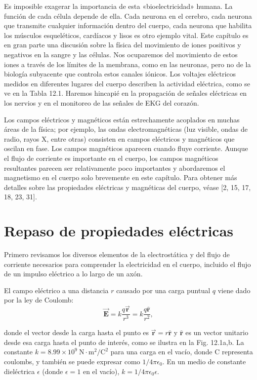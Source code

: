\documentclass[12pt]{book}
\begin{document}
Es imposible exagerar la importancia de esta «bioelectricidad» humana. La función de cada célula depende de ella. Cada neurona en el cerebro, cada neurona que transmite cualquier información dentro del cuerpo, cada neurona que habilita los músculos esqueléticos, cardíacos y lisos es otro ejemplo vital. Este capítulo es en gran parte una discusión sobre la física del movimiento de iones positivos y negativos en la sangre y las células. Nos ocuparemos del movimiento de estos iones a través de los límites de la membrana, como en las neuronas, pero no de la biología subyacente que controla estos canales iónicos. Los voltajes eléctricos medidos en diferentes lugares del cuerpo describen la actividad eléctrica, como se ve en la Tabla 12.1. Haremos hincapié en la propagación de señales eléctricas en los nervios y en el monitoreo de las señales de EKG del corazón.

Los campos eléctricos y magnéticos están estrechamente acoplados en muchas áreas de la física; por ejemplo, las ondas electromagnéticas (luz visible, ondas de radio, rayos X, entre otras) consisten en campos eléctricos y magnéticos que oscilan en fase. Los campos magnéticos aparecen cuando fluye corriente. Aunque el flujo de corriente es importante en el cuerpo, los campos magnéticos resultantes parecen ser relativamente poco importantes y abordaremos el magnetismo en el cuerpo solo brevemente en este capítulo. Para obtener más detalles sobre las propiedades eléctricas y magnéticas del cuerpo, véase [2, 15, 17, 18, 23, 31].

\section{Repaso de propiedades eléctricas}

Primero revisamos los diversos elementos de la electrostática y del flujo de corriente necesarios para comprender la electricidad en el cuerpo, incluido el flujo de un impulso eléctrico a lo largo de un axón.

El campo eléctrico a una distancia $r$ causado por una carga puntual $q$ viene dado por la ley de Coulomb:
\begin{equation}
\vec{\mathbf{E}} = k\frac{q\vec{\mathbf{r}}}{r^3} = k\frac{q\hat{\mathbf{r}}}{r^2}, \label{eq:12.1}
\end{equation}

\noindent donde el vector desde la carga hasta el punto es $\vec{\mathbf{r}} = r\hat{\mathbf{r}}$ y $\hat{\mathbf{r}}$ es un vector unitario desde esa carga hasta el punto de interés, como se ilustra en la Fig. 12.1a,b. La constante $k = 8.99 \times 10^9\ \text{N}\cdot\text{m}^2/\text{C}^2$ para una carga en el vacío, donde $\text{C}$ representa coulombs, y también se puede expresar como $1/4\pi\epsilon_0$. En un medio de constante dieléctrica $\epsilon$ (donde $\epsilon = 1$ en el vacío), $k = 1/4\pi\epsilon_0\epsilon$.
\end{document}
